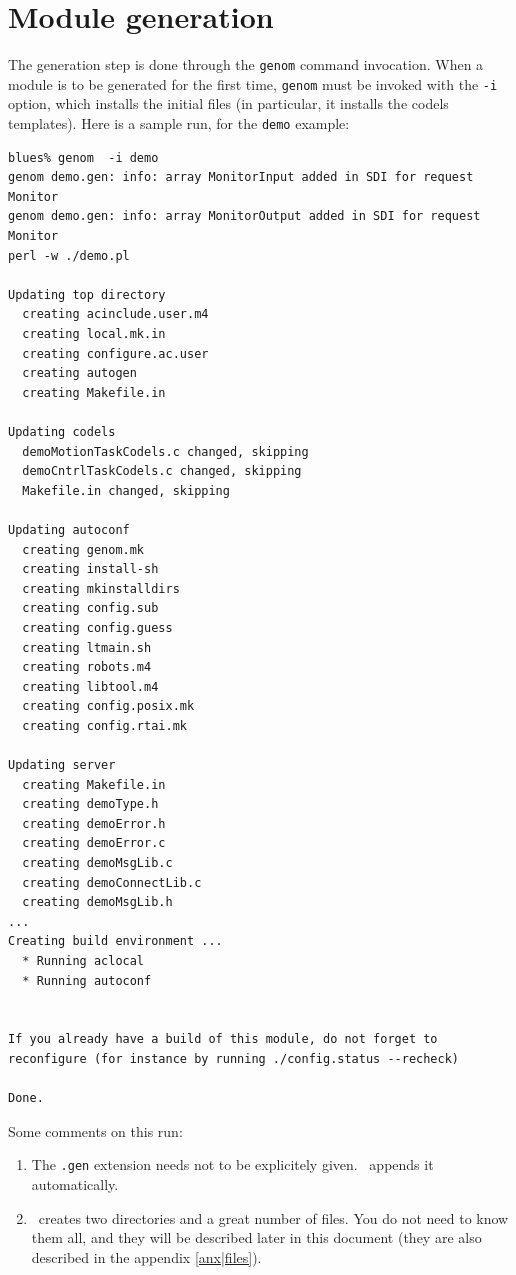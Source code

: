 \section{Module generation}
\label{sec|session|generate}

The  generation step is done  through the \texttt{genom} command invocation.
When a module is to be generated for the  first time, \texttt{genom} must be
invoked  with the \texttt{-i} option, which installs  the initial files (in
particular, it installs the codels templates).  Here is a sample run, for
the \texttt{demo} example:

\begin{center}
\begin{cartouche}\small
\begin{verbatim}
blues% genom  -i demo
genom demo.gen: info: array MonitorInput added in SDI for request Monitor
genom demo.gen: info: array MonitorOutput added in SDI for request Monitor
perl -w ./demo.pl

Updating top directory
  creating acinclude.user.m4
  creating local.mk.in
  creating configure.ac.user
  creating autogen
  creating Makefile.in

Updating codels
  demoMotionTaskCodels.c changed, skipping
  demoCntrlTaskCodels.c changed, skipping
  Makefile.in changed, skipping

Updating autoconf
  creating genom.mk
  creating install-sh
  creating mkinstalldirs
  creating config.sub
  creating config.guess
  creating ltmain.sh
  creating robots.m4
  creating libtool.m4
  creating config.posix.mk
  creating config.rtai.mk

Updating server
  creating Makefile.in
  creating demoType.h
  creating demoError.h
  creating demoError.c
  creating demoMsgLib.c
  creating demoConnectLib.c
  creating demoMsgLib.h
...
Creating build environment ...
  * Running aclocal
  * Running autoconf


If you already have a build of this module, do not forget to
reconfigure (for instance by running ./config.status --recheck)

Done.

\end{verbatim}
\end{cartouche}
\end{center}

\bigbreak

Some comments on this run:

\begin{enumerate}
   \item  The \texttt{.gen}  extension   needs   not  to be    explicitely
   given. \GenoM\ appends it automatically.

   \item \GenoM\ creates two directories and a great number of files. You
   do not need to know them all, and they will be described later in this
   document (they are also described in the appendix \ref{anx|files}).
\end{enumerate}

